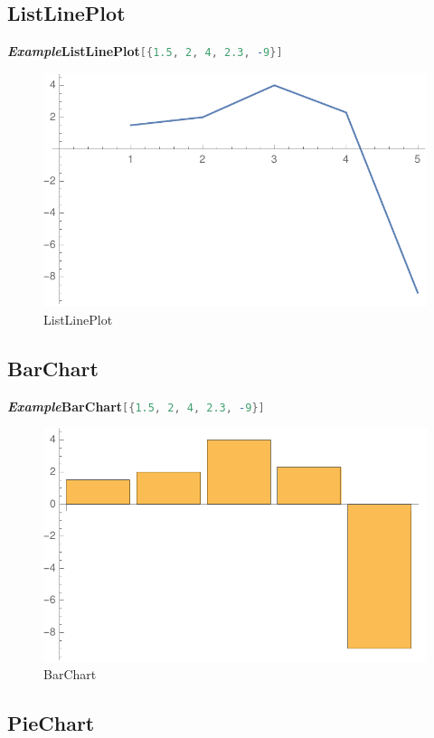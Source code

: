 \documentclass[10pt]{book}
\begin{document}
\subsection{ListLinePlot}
\label{subsec:label}
\noindent\emph{\textbf{Example}}\quad\textbf{ListLinePlot}\lstinline[language=Mathematica]|[{1.5, 2, 4, 2.3, -9}]|
\begin{figure}[H]
  \centering
  \includegraphics[width=0.45\linewidth]{figures/ListLinePlot.pdf}
  \caption{ListLinePlot}
\end{figure}

\subsection{BarChart}
\label{subsec:label}

\noindent\emph{\textbf{Example}}\quad\textbf{BarChart}\lstinline[language=Mathematica]|[{1.5, 2, 4, 2.3, -9}]|



\begin{figure}[H]
  \centering
  \includegraphics[width=0.45\linewidth]{figures/BarChart}
  \caption{BarChart}
\end{figure}

\subsection{PieChart}
\label{subsec:label}
\end{document}
